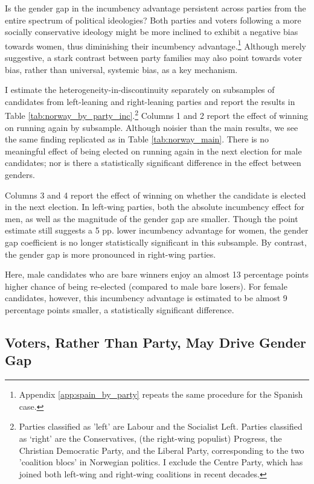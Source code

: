 \documentclass[12pt]{article}
\begin{document}


Is the gender gap in the incumbency advantage persistent across parties from the entire spectrum of political ideologies? Both parties and voters following a more socially conservative ideology might be more inclined to exhibit a negative bias towards women, thus diminishing their incumbency advantage.\footnote{Appendix \ref{app:spain_by_party} repeats the same procedure for the Spanish case. } Although merely suggestive, a stark contrast between party families may also point towards voter bias, rather than universal, systemic bias, as a key mechanism.

I estimate the heterogeneity-in-discontinuity separately on subsamples of candidates from left-leaning and right-leaning parties and report the results in Table \ref{tab:norway_by_party_inc}.\footnote{Parties classified as 'left' are Labour and the Socialist Left. Parties classified as `right' are the Conservatives, (the right-wing populist) Progress, the Christian Democratic Party, and the Liberal Party, corresponding to the two 'coalition blocs' in Norwegian politics. I exclude the Centre Party, which has joined both left-wing and right-wing coalitions in recent decades.}  Columns 1 and 2 report the effect of winning on running again by subsample. Although noisier than the main results, we see the same finding replicated as in Table \ref{tab:norway_main}. There is no meaningful effect of being elected on running again in the next election for male candidates; nor is there a statistically significant difference in the effect between genders.

Columns 3 and 4 report the effect of winning on whether the candidate is elected in the next election. In left-wing parties, both the absolute incumbency effect for men, as well as the magnitude of the gender gap are smaller. Though the point estimate still suggests a 5 pp. lower incumbency advantage for women, the gender gap coefficient is no longer statistically significant in this subsample. By contrast, the gender gap is more pronounced in right-wing parties.

Here, male candidates who are bare winners enjoy an almost 13 percentage points higher chance of being re-elected (compared to male bare losers). For female candidates, however, this incumbency advantage is estimated to be almost 9 percentage points smaller, a statistically significant difference.


\subsection{Voters, Rather Than Party, May Drive Gender Gap}
\end{document}
